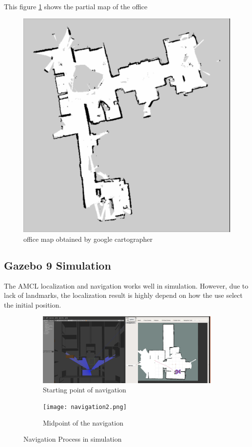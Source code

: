 \documentclass[letterpaper, 10 pt, conference]{ieeeconf}  %
\begin{document}
This figure \ref{fig:officeMap} shows the partial map of the office 
\begin{figure}[!pht]
  \includegraphics[width=\linewidth]{officeMap.png}
  \caption{office map obtained by google cartographer} 
  \label{fig:officeMap}
\end{figure}
\subsection{Gazebo 9 Simulation}
The AMCL localization and navigation works well in simulation. However, due to lack of landmarks, the localization result is highly depend on how the use select the initial position.
\begin{figure}[!pt]
    \begin{subfigure}[b]{0.5\textwidth}
       \includegraphics[width=1\linewidth]{navigation.png}
       \caption{Starting point of navigation}
       \label{fig:Ng1} 
    \end{subfigure}
    \begin{subfigure}[b]{0.5\textwidth}
       \texttt{[image: navigation2.png]}
       \caption{Midpoint of the navigation}
       \label{fig:Ng2}
    \end{subfigure}
  \caption{Navigation Process in simulation} 
  \label{fig:navigation_result}
\end{figure}
\end{document}
